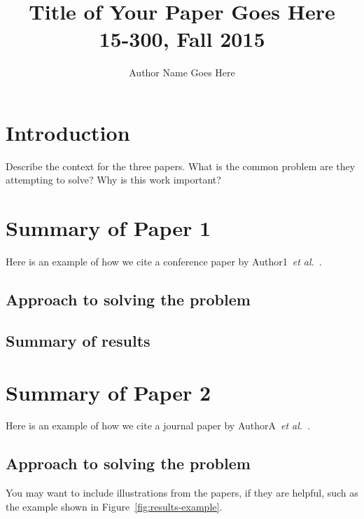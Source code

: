 \documentclass[11pt]{article}
\title{Title of Your Paper Goes Here  \\
15-300, Fall 2015
}
\author{Author Name Goes Here}
\begin{document}
\maketitle


\section{Introduction}

Describe the context for the three papers.  What is the common problem are
they attempting to solve?  Why is this work important?  

\section{Summary of Paper 1}
\label{ref:paper1-summary}

Here is an example
of how we cite a conference paper by Author1~\emph{et
  al.}~\cite{ConferencePaperExampleTag}.  


\subsection{Approach to solving the problem}
\label{ref:paper1-approach}

\subsection{Summary of results}
\label{ref:paper1-results}

\section{Summary of Paper 2}
\label{ref:paper2-summary}

Here is an example of how we cite
a journal paper by AuthorA~\emph{et al.}~\cite{JournalPaperExampleTag}.

\subsection{Approach to solving the problem}
\label{ref:paper2-approach}

You may want to include illustrations from the papers, if they are helpful,
such as the example shown in Figure~\ref{fig:results-example}.
\end{document}
